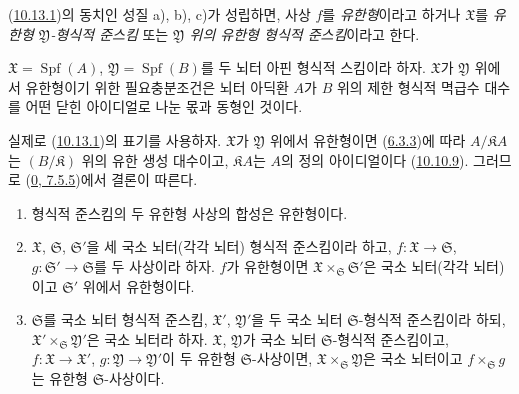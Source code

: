 \begin{definition}[10.13.3]
\label{I.10.13.3-ko}
(\hyperref[I.10.13.1-ko]{10.13.1})의 동치인 성질 a), b), c)가
성립하면, 사상 $f$를 \emph{유한형}이라고 하거나 $\mathfrak{X}$를
\emph{유한형 $\mathfrak{Y}$-형식적 준스킴} 또는
\emph{$\mathfrak{Y}$ 위의 유한형 형식적 준스킴}이라고 한다.
\end{definition}

\begin{corollary}[10.13.4]
\label{I.10.13.4-ko}
$\mathfrak{X}=\operatorname{Spf}(A)$,
$\mathfrak{Y}=\operatorname{Spf}(B)$를 두 뇌터 아핀 형식적 스킴이라
하자. $\mathfrak{X}$가 $\mathfrak{Y}$ 위에서 유한형이기 위한
필요충분조건은 뇌터 아딕환 $A$가 $B$ 위의 제한 형식적 멱급수 대수를
어떤 닫힌 아이디얼로 나눈 몫과 동형인 것이다.
\end{corollary}

실제로 (\hyperref[I.10.13.1-ko]{10.13.1})의 표기를 사용하자.
$\mathfrak{X}$가 $\mathfrak{Y}$ 위에서 유한형이면
(\hyperref[I.6.3.3-ko]{6.3.3})에 따라 $A/\mathfrak{K}A$는
$(B/\mathfrak{K})$ 위의 유한 생성 대수이고,
$\mathfrak{K}A$는 $A$의 정의 아이디얼이다
(\hyperref[I.10.10.9-ko]{10.10.9}). 그러므로
(\hyperref[0.7.5.5-ko]{0, 7.5.5})에서 결론이 따른다.

\begin{proposition}[10.13.5]
\label{I.10.13.5-ko}
\medskip\noindent
\begin{enumerate}
  \item[\rm{(i)}] 형식적 준스킴의 두 유한형 사상의 합성은
    유한형이다.


  \item[\rm{(ii)}] $\mathfrak{X}$, $\mathfrak{S}$,
    $\mathfrak{S}'$을 세 국소 뇌터(각각 뇌터) 형식적 준스킴이라 하고,
    $f:\mathfrak{X}\to\mathfrak{S}$,
    $g:\mathfrak{S}'\to\mathfrak{S}$를 두 사상이라 하자. $f$가
    유한형이면 $\mathfrak{X}\times_{\mathfrak{S}}\mathfrak{S}'$은
    국소 뇌터(각각 뇌터)이고 $\mathfrak{S}'$ 위에서 유한형이다.
  \item[\rm{(iii)}] $\mathfrak{S}$를 국소 뇌터 형식적 준스킴,
    $\mathfrak{X}'$, $\mathfrak{Y}'$을 두 국소 뇌터
    $\mathfrak{S}$-형식적 준스킴이라 하되,
    $\mathfrak{X}'\times_{\mathfrak{S}}\mathfrak{Y}'$은 국소 뇌터라
    하자.
    $\mathfrak{X}$, $\mathfrak{Y}$가 국소 뇌터
    $\mathfrak{S}$-형식적 준스킴이고,
    $f:\mathfrak{X}\to\mathfrak{X}'$,
    $g:\mathfrak{Y}\to\mathfrak{Y}'$이 두 유한형
    $\mathfrak{S}$-사상이면,
    $\mathfrak{X}\times_{\mathfrak{S}}\mathfrak{Y}$은 국소 뇌터이고
    $f\times_{\mathfrak{S}}g$는 유한형 $\mathfrak{S}$-사상이다.
\end{enumerate}
\end{proposition}

